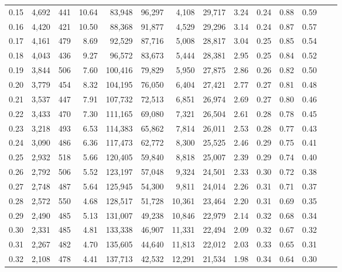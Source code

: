 \begin{tabular}{rrrrrrrrrrrrrr}
0.15 &  4,692 &  441 &   10.64 &   83,948 &   96,297 &   4,108 &  29,717 &  3.24 &  0.24 &  0.88 &      0.59 \\
0.16 &  4,420 &  421 &   10.50 &   88,368 &   91,877 &   4,529 &  29,296 &  3.14 &  0.24 &  0.87 &      0.57 \\
0.17 &  4,161 &  479 &    8.69 &   92,529 &   87,716 &   5,008 &  28,817 &  3.04 &  0.25 &  0.85 &      0.54 \\
0.18 &  4,043 &  436 &    9.27 &   96,572 &   83,673 &   5,444 &  28,381 &  2.95 &  0.25 &  0.84 &      0.52 \\
0.19 &  3,844 &  506 &    7.60 &  100,416 &   79,829 &   5,950 &  27,875 &  2.86 &  0.26 &  0.82 &      0.50 \\
0.20 &  3,779 &  454 &    8.32 &  104,195 &   76,050 &   6,404 &  27,421 &  2.77 &  0.27 &  0.81 &      0.48 \\
0.21 &  3,537 &  447 &    7.91 &  107,732 &   72,513 &   6,851 &  26,974 &  2.69 &  0.27 &  0.80 &      0.46 \\
0.22 &  3,433 &  470 &    7.30 &  111,165 &   69,080 &   7,321 &  26,504 &  2.61 &  0.28 &  0.78 &      0.45 \\
0.23 &  3,218 &  493 &    6.53 &  114,383 &   65,862 &   7,814 &  26,011 &  2.53 &  0.28 &  0.77 &      0.43 \\
0.24 &  3,090 &  486 &    6.36 &  117,473 &   62,772 &   8,300 &  25,525 &  2.46 &  0.29 &  0.75 &      0.41 \\
0.25 &  2,932 &  518 &    5.66 &  120,405 &   59,840 &   8,818 &  25,007 &  2.39 &  0.29 &  0.74 &      0.40 \\
0.26 &  2,792 &  506 &    5.52 &  123,197 &   57,048 &   9,324 &  24,501 &  2.33 &  0.30 &  0.72 &      0.38 \\
0.27 &  2,748 &  487 &    5.64 &  125,945 &   54,300 &   9,811 &  24,014 &  2.26 &  0.31 &  0.71 &      0.37 \\
0.28 &  2,572 &  550 &    4.68 &  128,517 &   51,728 &  10,361 &  23,464 &  2.20 &  0.31 &  0.69 &      0.35 \\
0.29 &  2,490 &  485 &    5.13 &  131,007 &   49,238 &  10,846 &  22,979 &  2.14 &  0.32 &  0.68 &      0.34 \\
0.30 &  2,331 &  485 &    4.81 &  133,338 &   46,907 &  11,331 &  22,494 &  2.09 &  0.32 &  0.67 &      0.32 \\
0.31 &  2,267 &  482 &    4.70 &  135,605 &   44,640 &  11,813 &  22,012 &  2.03 &  0.33 &  0.65 &      0.31 \\
0.32 &  2,108 &  478 &    4.41 &  137,713 &   42,532 &  12,291 &  21,534 &  1.98 &  0.34 &  0.64 &      0.30 \\

\end{tabular}
